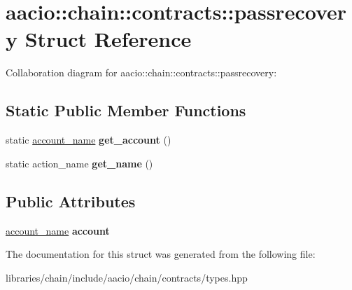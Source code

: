 \hypertarget{structaacio_1_1chain_1_1contracts_1_1passrecovery}{}\section{aacio\+:\+:chain\+:\+:contracts\+:\+:passrecovery Struct Reference}
\label{structaacio_1_1chain_1_1contracts_1_1passrecovery}


Collaboration diagram for aacio\+:\+:chain\+:\+:contracts\+:\+:passrecovery\+:
\subsection*{Static Public Member Functions}
\begin{DoxyCompactItemize}
\item 
\mbox{\label{structaacio_1_1chain_1_1contracts_1_1passrecovery_a27b215a2a3f2b9e69dcc8acbc49f853d}} 
static \mbox{\hyperlink{structaacio_1_1chain_1_1name}{account\+\_\+name}} {\bfseries get\+\_\+account} ()
\item 
\mbox{\label{structaacio_1_1chain_1_1contracts_1_1passrecovery_ae8bafd0deab455ca1a07e87f8467d4c5}} 
static action\+\_\+name {\bfseries get\+\_\+name} ()
\end{DoxyCompactItemize}
\subsection*{Public Attributes}
\begin{DoxyCompactItemize}
\item 
\mbox{\label{structaacio_1_1chain_1_1contracts_1_1passrecovery_ab4dfb19c206876597d177c7e8a7c98fc}} 
\mbox{\hyperlink{structaacio_1_1chain_1_1name}{account\+\_\+name}} {\bfseries account}
\end{DoxyCompactItemize}


The documentation for this struct was generated from the following file\+:\begin{DoxyCompactItemize}
\item 
libraries/chain/include/aacio/chain/contracts/types.\+hpp\end{DoxyCompactItemize}
